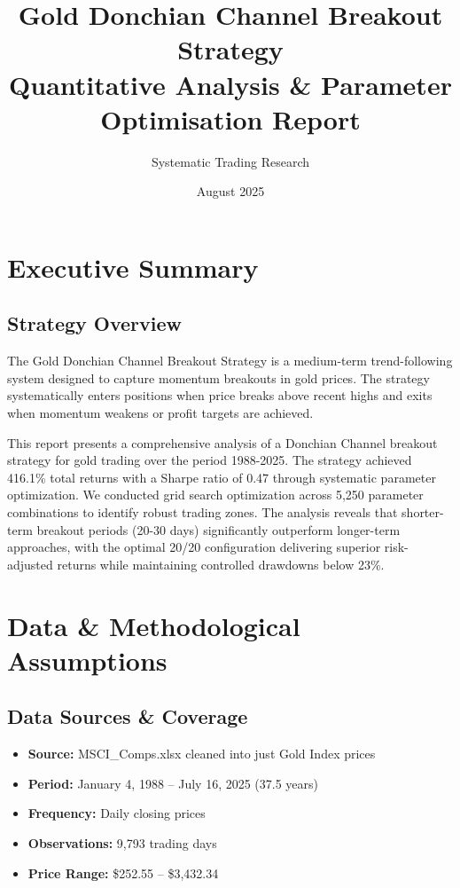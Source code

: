 \documentclass[11pt,a4paper]{article}
\title{\textbf{\Large Gold Donchian Channel Breakout Strategy}\\
\large Quantitative Analysis \& Parameter Optimisation Report}
\author{Systematic Trading Research}
\date{August 2025}
\begin{document}
\maketitle

\section{Executive Summary}

\subsection{Strategy Overview}
\begin{flushleft}
The Gold Donchian Channel Breakout Strategy is a medium-term trend-following system designed to capture momentum breakouts in gold prices. The strategy systematically enters positions when price breaks above recent highs and exits when momentum weakens or profit targets are achieved.
\end{flushleft}

\vspace{0.1cm}

\begin{flushleft}
This report presents a comprehensive analysis of a Donchian Channel breakout strategy for gold trading over the period 1988-2025. The strategy achieved 416.1\% total returns with a Sharpe ratio of 0.47 through systematic parameter optimization. We conducted grid search optimization across 5,250 parameter combinations to identify robust trading zones. The analysis reveals that shorter-term breakout periods (20-30 days) significantly outperform longer-term approaches, with the optimal 20/20 configuration delivering superior risk-adjusted returns while maintaining controlled drawdowns below 23\%.
\end{flushleft}

\section{Data \& Methodological Assumptions}

\subsection{Data Sources \& Coverage}
\begin{itemize}[leftmargin=*]
\item \textbf{Source:} MSCI\_Comps.xlsx cleaned into just Gold Index prices
\item \textbf{Period:} January 4, 1988 -- July 16, 2025 (37.5 years)
\item \textbf{Frequency:} Daily closing prices
\item \textbf{Observations:} 9,793 trading days
\item \textbf{Price Range:} \$252.55 -- \$3,432.34
\end{itemize}
\end{document}
